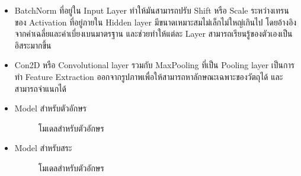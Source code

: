 \documentclass[12pt,oneside,openright,a4paper]{cpe-thai-project}
\begin{document}
\begin{itemize}
  \item BatchNorm ที่อยู่ใน Input Layer ทำให้มันสามารถปรับ Shift หรือ Scale ระหว่างเทรน ของ Activation  
  ที่อยู่ภายใน Hidden layer มีขนาดเหมาะสมไม่เล็กไม่ใหญ่เกินไป โดยอ้างอิงจากค่าเฉลี่ยและค่าเบี่ยงเบนมาตรฐาน และช่วยทำให้แต่ละ Layer สามารถเรียนรู้ของตัวเองเป็นอิสระมากขึ้น
  \item Con2D หรือ Convolutional layer รวมกับ MaxPooling ที่เป็น Pooling layer เป็นการทำ Feature Extraction ออกจากรูปภาพเพื่อให้สามารถหาลักษณะเฉพาะของวัตถุได้ และสามารถจำแนกได้
  \item Model สำหรับตัวอักษร 
  \begin{figure}[!ht]\centering
    \setlength{\fboxrule}{0.2mm} %
    \setlength{\fboxsep}{1cm}
    \caption{โมเดลสำหรับตัวอักษร}\label{fig:modelarchitecture}
   \end{figure}
   \newpage
  \item Model สำหรับสระ
  \begin{figure}[!ht]\centering
    \setlength{\fboxrule}{0.2mm} %
    \setlength{\fboxsep}{1cm}
    \caption{โมเดลสำหรับตัวอักษร}\label{fig:modelarchitecturevowel}
   \end{figure}
  \end{itemize}
\newpage
\end{document}
